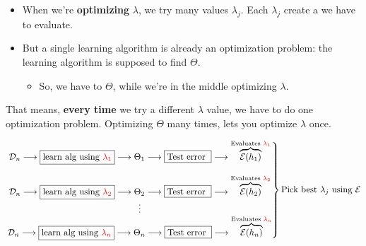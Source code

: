         \begin{itemize}
            \item When we're \textbf{optimizing} $\lambda$, we try many values $\lambda_j$. Each $\lambda_j$ create a  we have to evaluate. 
            
            \item But a single learning algorithm is already an optimization problem: the learning algorithm is supposed to find $\Theta$.

                \begin{itemize}
                    \item So, we have to  $\Theta$, while we're in the middle optimizing $\lambda$.
                \end{itemize}
        \end{itemize}
        
        
        That means, \textbf{every time} we try a different $\lambda$ value, we have to do one optimization problem. Optimizing $\Theta$ many times, lets you optimize $\lambda$ once.

        \begin{equation*}
                \begin{rcases}
                \begin{matrix}
                    {\cal D}_n \longrightarrow 
                    \boxed{\text{learn alg using $\textcolor{red}{\lambda_1}$}} 
                    \longrightarrow \Theta_1
                    \longrightarrow
                    \boxed{\text{Test error }}
                    \longrightarrow 
                    \overbrace{\mathcal{E}(h_1)} ^{\text{Evaluates }\textcolor{red}{\lambda_1}} \\\\
                    {\cal D}_n \longrightarrow 
                    \boxed{\text{learn alg using $\textcolor{red}{\lambda_2}$}} 
                    \longrightarrow \Theta_2
                    \longrightarrow
                    \boxed{\text{Test error }}
                    \longrightarrow 
                    \overbrace{\mathcal{E}(h_2)} ^{\text{Evaluates }\textcolor{red}{\lambda_2}} \\
                    \vdots \\
                    {\cal D}_n \longrightarrow 
                    \boxed{\text{learn alg using $\textcolor{red}{\lambda_n}$}} 
                    \longrightarrow \Theta_n
                    \longrightarrow
                    \boxed{\text{Test error }}
                    \longrightarrow 
                    \overbrace{\mathcal{E}(h_n)} ^{\text{Evaluates }\textcolor{red}{\lambda_n}}
                \end{matrix}
                \end{rcases}\text{Pick best $\lambda_j$ using $\mathcal{E}$}  
            \end{equation*}
        
